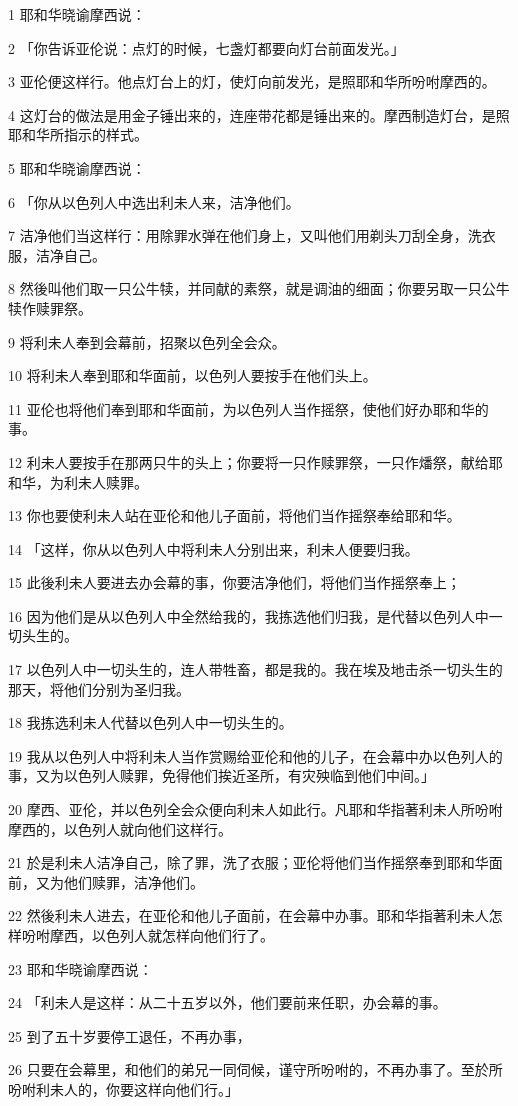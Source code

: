\par 1 耶和华晓谕摩西说：
\par 2 「你告诉亚伦说：点灯的时候，七盏灯都要向灯台前面发光。」
\par 3 亚伦便这样行。他点灯台上的灯，使灯向前发光，是照耶和华所吩咐摩西的。
\par 4 这灯台的做法是用金子锤出来的，连座带花都是锤出来的。摩西制造灯台，是照耶和华所指示的样式。
\par 5 耶和华晓谕摩西说：
\par 6 「你从以色列人中选出利未人来，洁净他们。
\par 7 洁净他们当这样行：用除罪水弹在他们身上，又叫他们用剃头刀刮全身，洗衣服，洁净自己。
\par 8 然後叫他们取一只公牛犊，并同献的素祭，就是调油的细面；你要另取一只公牛犊作赎罪祭。
\par 9 将利未人奉到会幕前，招聚以色列全会众。
\par 10 将利未人奉到耶和华面前，以色列人要按手在他们头上。
\par 11 亚伦也将他们奉到耶和华面前，为以色列人当作摇祭，使他们好办耶和华的事。
\par 12 利未人要按手在那两只牛的头上；你要将一只作赎罪祭，一只作燔祭，献给耶和华，为利未人赎罪。
\par 13 你也要使利未人站在亚伦和他儿子面前，将他们当作摇祭奉给耶和华。
\par 14 「这样，你从以色列人中将利未人分别出来，利未人便要归我。
\par 15 此後利未人要进去办会幕的事，你要洁净他们，将他们当作摇祭奉上；
\par 16 因为他们是从以色列人中全然给我的，我拣选他们归我，是代替以色列人中一切头生的。
\par 17 以色列人中一切头生的，连人带牲畜，都是我的。我在埃及地击杀一切头生的那天，将他们分别为圣归我。
\par 18 我拣选利未人代替以色列人中一切头生的。
\par 19 我从以色列人中将利未人当作赏赐给亚伦和他的儿子，在会幕中办以色列人的事，又为以色列人赎罪，免得他们挨近圣所，有灾殃临到他们中间。」
\par 20 摩西、亚伦，并以色列全会众便向利未人如此行。凡耶和华指著利未人所吩咐摩西的，以色列人就向他们这样行。
\par 21 於是利未人洁净自己，除了罪，洗了衣服；亚伦将他们当作摇祭奉到耶和华面前，又为他们赎罪，洁净他们。
\par 22 然後利未人进去，在亚伦和他儿子面前，在会幕中办事。耶和华指著利未人怎样吩咐摩西，以色列人就怎样向他们行了。
\par 23 耶和华晓谕摩西说：
\par 24 「利未人是这样：从二十五岁以外，他们要前来任职，办会幕的事。
\par 25 到了五十岁要停工退任，不再办事，
\par 26 只要在会幕里，和他们的弟兄一同伺候，谨守所吩咐的，不再办事了。至於所吩咐利未人的，你要这样向他们行。」

